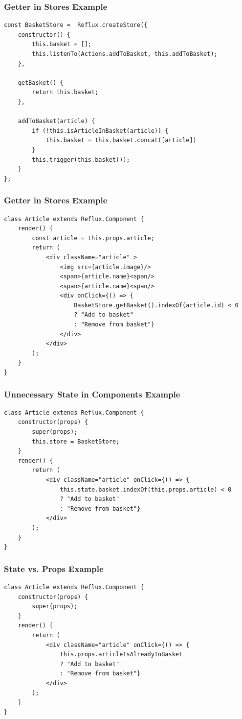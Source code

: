 \documentclass{beamer}
\begin{document}
\begin{frame}[fragile]\frametitle{Getter in Stores \textendash{} Example}
\begin{lstlisting}[style=htmlcssjs]
const BasketStore =  Reflux.createStore({
    constructor() {
        this.basket = [];
        this.listenTo(Actions.addToBasket, this.addToBasket);
    },

    getBasket() {
        return this.basket;
    },

    addToBasket(article) {
        if (!this.isArticleInBasket(article)) {
            this.basket = this.basket.concat([article])
        }
        this.trigger(this.basket());
    }
};
\end{lstlisting}
\end{frame}

\begin{frame}[fragile]\frametitle{Getter in Stores \textendash{} Example}
\begin{lstlisting}[style=htmlcssjs]
class Article extends Reflux.Component {
    render() {
        const article = this.props.article;
        return (
            <div className="article" >
                <img src={article.image}/>
                <span>{article.name}<span/>
                <span>{article.name}<span/>
                <div onClick={() => {
                    BasketStore.getBasket().indexOf(article.id) < 0
                    ? "Add to basket"
                    : "Remove from basket"}
                </div>
            </div>
        );
    }
}
\end{lstlisting}
\end{frame}

\begin{frame}[fragile]\frametitle{Unnecessary State in Components \textendash{} Example}
\begin{lstlisting}[style=htmlcssjs]
class Article extends Reflux.Component {
    constructor(props) {
        super(props);
        this.store = BasketStore;
    }
    render() {
        return (
            <div className="article" onClick={() => {
                this.state.basket.indexOf(this.props.article) < 0
                ? "Add to basket"
                : "Remove from basket"}
            </div>
        );
    }
}
\end{lstlisting}
\end{frame}

\begin{frame}[fragile]\frametitle{State vs. Props \textendash{} Example}
\begin{lstlisting}[style=htmlcssjs]
class Article extends Reflux.Component {
    constructor(props) {
        super(props);
    }
    render() {
        return (
            <div className="article" onClick={() => {
                this.props.articleIsAlreadyInBasket
                ? "Add to basket"
                : "Remove from basket"}
            </div>
        );
    }
}
\end{lstlisting}
\end{frame}
\end{document}
